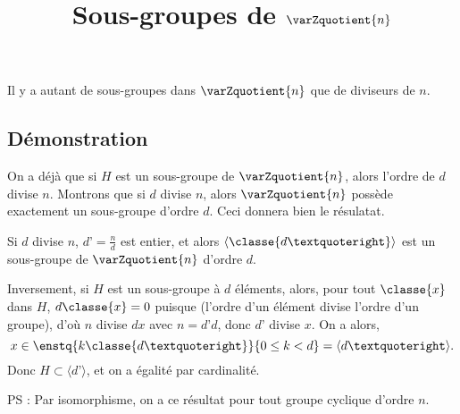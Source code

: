 \documentclass[fontsize=12pt,twoside=false,parskip=half, french]{scrartcl}
\title{Sous-groupes de $\varZquotient{n}$}
\date{}
\author{}
\begin{document}
\maketitle
   \begin{Theoreme}
      Il y a autant de sous-groupes dans $\varZquotient{n}$ que de diviseurs de $n$.
   \end{Theoreme}
   \subsection{Démonstration}
      On a déjà que si $H$ est un sous-groupe de $\varZquotient{n}$, alors l’ordre
      de $d$ divise $n$. Montrons que si $d$ divise $n$, alors $\varZquotient{n}$ possède exactement un sous-groupe d’ordre $d$. Ceci donnera bien le résulatat.

      Si $d$ divise $n$, $d’ = \frac{n}{d}$ est entier, et alors 
      $\langle \classe{d’} \rangle$ est un sous-groupe de $\varZquotient{n}$
      d’ordre $d$.
      
      Inversement, si $H$ est un sous-groupe à $d$ éléments, alors, pour tout 
      $\classe{x}$ dans $H$, $d\classe{x} = 0$ puisque (l’ordre d’un élément
      divise l’ordre d’un groupe), d’où $n$ divise $dx$ avec $n = d’d$, donc
      $d’$ divise $x$. On a alors, 
      \[
         x \in \enstq{k\classe{d’}}{ 0 \leq k < d} = \langle d’ \rangle.
      \]
      Donc $H \subset \langle d’ \rangle$, et on a égalité par cardinalité.
      
      PS : Par isomorphisme, on a ce résultat pour tout groupe cyclique d’ordre $n$.
\end{document}
